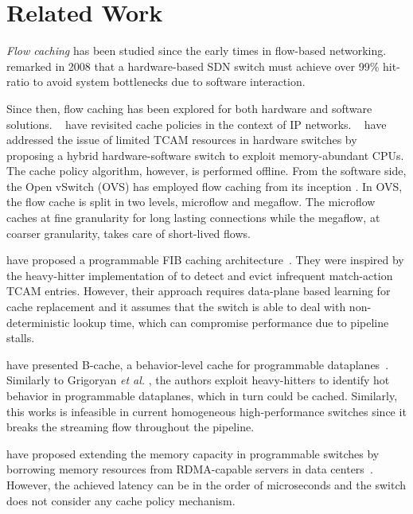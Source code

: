 \section{Related Work}\label{sec:related_works}

\textit{Flow caching} has been studied since the early times in flow-based networking.
\citeauthor{casado:2008}~\cite{casado:2008} remarked in 2008 that a hardware-based SDN switch must achieve over 99\% hit-ratio to avoid system bottlenecks due to software interaction.

Since then, flow caching has been explored for both hardware and software solutions.
\citeauthor{Kim:09}~\cite{Kim:09} have revisited cache policies in the context of IP networks.
\citeauthor{Katta:2014}~\cite{Katta:2014,Katta:2016} have addressed the issue of limited TCAM resources in hardware switches by proposing a hybrid hardware-software switch to exploit memory-abundant CPUs.
The cache policy algorithm, however, is performed offline. 
From the software side, the Open vSwitch (OVS) has employed flow caching from its inception \cite{Pfaff:15}.
In OVS, the flow cache is split in two levels, microflow and megaflow.
The microflow caches at fine granularity for long lasting connections while the megaflow, at coarser granularity, takes care of short-lived flows.

\citeauthor{Grigoryan:18} have proposed a programmable FIB caching architecture~\cite{Grigoryan:18}. They were inspired by the heavy-hitter implementation of \cite{Sivaraman:17} to detect and evict infrequent match-action TCAM entries. However, their approach requires data-plane based learning for cache replacement and it assumes that the switch is able to deal with non-deterministic lookup time, which can compromise performance due to pipeline stalls. 

\citeauthor{Zhang:2018} have presented B-cache, a behavior-level cache for programmable dataplanes~\cite{Zhang:2018}. Similarly to Grigoryan \textit{et al.} \cite{Grigoryan:18}, the authors exploit heavy-hitters to identify hot behavior in programmable dataplanes, which in turn could be cached. Similarly, this works is infeasible in current homogeneous high-performance switches since it breaks the streaming flow throughout the pipeline.

\citeauthor{Kim:2018} have proposed extending the memory capacity in programmable switches by borrowing memory resources from RDMA-capable servers in data centers~\cite{Kim:2018}. However, the achieved latency can be in the order of microseconds and the switch does not consider any cache policy mechanism.

